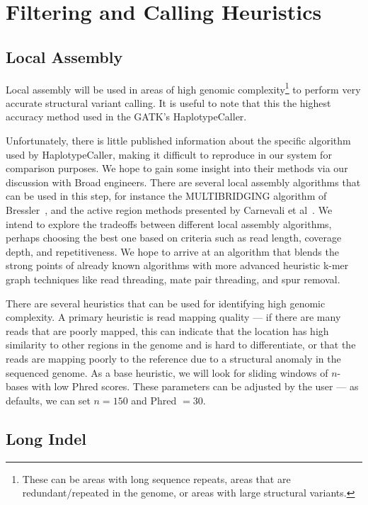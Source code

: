 \documentclass[11pt]{article}
\begin{document}
\section{Filtering and Calling Heuristics}
\label{sec:filtering-calling}

\subsection{Local Assembly}
\label{sec:local-assembly}

Local assembly will be used in areas of high genomic complexity\footnote{These can be areas with long sequence
repeats, areas that are redundant/repeated in the genome, or areas with large structural variants.} to perform very accurate
structural variant calling. It is useful to note that this the highest accuracy method used in the GATK's HaplotypeCaller.

Unfortunately, there is little published information about the specific algorithm used by HaplotypeCaller, making it difficult to
reproduce in our system for comparison purposes. We hope to gain some insight into their methods via our discussion with
Broad engineers. There are several local assembly algorithms that can be used in this step, for instance the MULTIBRIDGING
algorithm of Bressler~\cite{bresler13}, and the active region methods presented by Carnevali et al~\cite{carnevali12}.
We intend to explore the tradeoffs between different local assembly algorithms, perhaps choosing the best one based
on criteria such as read length, coverage depth, and repetitiveness. We hope to arrive at an algorithm that blends the strong
points of already known algorithms with more advanced heuristic k-mer graph techniques like read threading, mate pair
threading, and spur removal.

There are several heuristics that can be used for identifying high genomic complexity. A primary heuristic is read mapping
quality --- if there are many reads that are poorly mapped, this can indicate that the location has high similarity to other
regions in the genome and is hard to differentiate, or that the reads are mapping poorly to the reference due to a structural
anomaly in the sequenced genome. As a base heuristic, we will look for sliding windows of $n$-bases with low Phred scores.
These parameters can be adjusted by the user --- as defaults, we can set $n = 150$ and Phred $= 30$.

\subsection{Long Indel}
\label{sec:long-indel}
\end{document}

